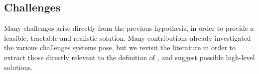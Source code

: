 
\subsection{Challenges}
\label{sec:Motivation-Challenges}

Many challenges arise directly from the previous hypothesis, in order to provide a feasible, tractable and realistic \IOT solution. Many contributions already investigated the various challenges \IOT systems pose, but we revisit the literature in order to extract those directly relevant to the definition of \IOT \DSLS, and suggest possible high-level solutions.

